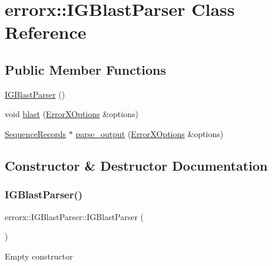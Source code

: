 \hypertarget{classerrorx_1_1_i_g_blast_parser}{}\section{errorx\+:\+:I\+G\+Blast\+Parser Class Reference}
\label{classerrorx_1_1_i_g_blast_parser}
\subsection*{Public Member Functions}
\begin{DoxyCompactItemize}
\item 
\mbox{\hyperlink{classerrorx_1_1_i_g_blast_parser_abae1912dcc92f0dbba19916f5756f3d2}{I\+G\+Blast\+Parser}} ()
\item 
void \mbox{\hyperlink{classerrorx_1_1_i_g_blast_parser_a9b252bb6f6bf829104d6caaf96f776f7}{blast}} (\mbox{\hyperlink{classerrorx_1_1_error_x_options}{Error\+X\+Options}} \&options)
\item 
\mbox{\hyperlink{classerrorx_1_1_sequence_records}{Sequence\+Records}} $\ast$ \mbox{\hyperlink{classerrorx_1_1_i_g_blast_parser_ac5d2a9eb14d830258b9462b1b246fa49}{parse\+\_\+output}} (\mbox{\hyperlink{classerrorx_1_1_error_x_options}{Error\+X\+Options}} \&options)
\end{DoxyCompactItemize}


\subsection{Constructor \& Destructor Documentation}
\mbox{\label{classerrorx_1_1_i_g_blast_parser_abae1912dcc92f0dbba19916f5756f3d2}} 
\subsubsection{\texorpdfstring{I\+G\+Blast\+Parser()}{IGBlastParser()}}
{\footnotesize\ttfamily errorx\+::\+I\+G\+Blast\+Parser\+::\+I\+G\+Blast\+Parser (\begin{DoxyParamCaption}{ }\end{DoxyParamCaption})}

Empty constructor 

